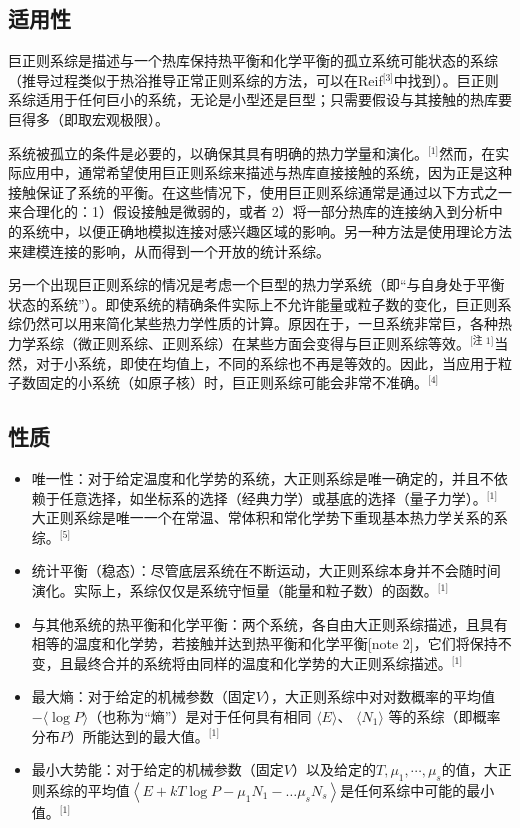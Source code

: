 \subsection{适用性}  
巨正则系综是描述与一个热库保持热平衡和化学平衡的孤立系统可能状态的系综（推导过程类似于热浴推导正常正则系综的方法，可以在Reif\(^\text{[3]}\)中找到）。巨正则系综适用于任何巨小的系统，无论是小型还是巨型；只需要假设与其接触的热库要巨得多（即取宏观极限）。

系统被孤立的条件是必要的，以确保其具有明确的热力学量和演化。\(^\text{[1]}\)然而，在实际应用中，通常希望使用巨正则系综来描述与热库直接接触的系统，因为正是这种接触保证了系统的平衡。在这些情况下，使用巨正则系综通常是通过以下方式之一来合理化的：1）假设接触是微弱的，或者 2）将一部分热库的连接纳入到分析中的系统中，以便正确地模拟连接对感兴趣区域的影响。另一种方法是使用理论方法来建模连接的影响，从而得到一个开放的统计系综。

另一个出现巨正则系综的情况是考虑一个巨型的热力学系统（即“与自身处于平衡状态的系统”）。即使系统的精确条件实际上不允许能量或粒子数的变化，巨正则系综仍然可以用来简化某些热力学性质的计算。原因在于，一旦系统非常巨，各种热力学系综（微正则系综、正则系综）在某些方面会变得与巨正则系综等效。\(^\text{[注 1]}\)当然，对于小系统，即使在均值上，不同的系综也不再是等效的。因此，当应用于粒子数固定的小系统（如原子核）时，巨正则系综可能会非常不准确。\(^\text{[4]}\)
\subsection{性质}  
\begin{itemize}
\item 唯一性：对于给定温度和化学势的系统，大正则系综是唯一确定的，并且不依赖于任意选择，如坐标系的选择（经典力学）或基底的选择（量子力学）。\(^\text{[1]}\) 大正则系综是唯一一个在常温、常体积和常化学势下重现基本热力学关系的系综。\(^\text{[5]}\)  
\item 统计平衡（稳态）：尽管底层系统在不断运动，大正则系综本身并不会随时间演化。实际上，系综仅仅是系统守恒量（能量和粒子数）的函数。\(^\text{[1]}\)  
\item 与其他系统的热平衡和化学平衡：两个系统，各自由大正则系综描述，且具有相等的温度和化学势，若接触并达到热平衡和化学平衡[note 2]，它们将保持不变，且最终合并的系统将由同样的温度和化学势的大正则系综描述。\(^\text{[1]}\) 
\item 最大熵：对于给定的机械参数（固定\(V\)），大正则系综中对对数概率的平均值 \( -\langle \log P \rangle \)（也称为“熵”）是对于任何具有相同 \( \langle E \rangle \)、 \( \langle N_1 \rangle \) 等的系综（即概率分布\(P\)）所能达到的最大值。\(^\text{[1]}\) 
\item 最小大势能：对于给定的机械参数（固定\(V\)）以及给定的\(T,\mu_1,\cdots,\mu_s\)的值，大正则系综的平均值\({\displaystyle \left\langle E + kT\log P - \mu_{1}N_{1} - \ldots \mu_{s}N_{s} \right\rangle}\)是任何系综中可能的最小值。\(^\text{[1]}\)
\end{itemize}

